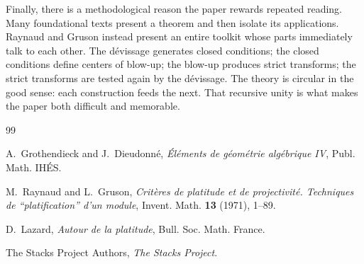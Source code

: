 \documentclass[11pt,oneside]{article}
\begin{document}
Finally, there is a methodological reason the paper rewards repeated reading.  Many foundational texts present a theorem and then isolate its applications.  Raynaud and Gruson instead present an entire toolkit whose parts immediately talk to each other.  The d\'evissage generates closed conditions; the closed conditions define centers of blow-up; the blow-up produces strict transforms; the strict transforms are tested again by the d\'evissage.  The theory is circular in the good sense: each construction feeds the next.  That recursive unity is what makes the paper both difficult and memorable.


\begin{thebibliography}{99}

A.~Grothendieck and J.~Dieudonn\'e,
\emph{\'El\'ements de g\'eom\'etrie alg\'ebrique IV}, Publ. Math. IH\'ES.

M.~Raynaud and L.~Gruson,
\emph{Crit\`eres de platitude et de projectivit\'e. Techniques de \enquote{platification} d'un module},
Invent. Math. \textbf{13} (1971), 1--89.

D.~Lazard,
\emph{Autour de la platitude}, Bull. Soc. Math. France.

The Stacks Project Authors,
\emph{The Stacks Project}.

\end{thebibliography}
\end{document}
